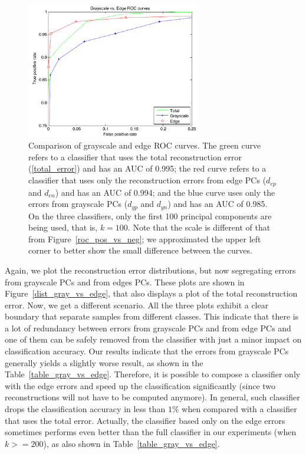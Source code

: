 \documentclass[10pt, conference, compsocconf]{IEEEtran}
\begin{document}
\begin{figure}[t!]
\centering
\includegraphics[width=3in]{roc_gray_vs_edge}
\caption{Comparison of grayscale and edge ROC curves. The green curve refers to a classifier that uses the total reconstruction error (\ref{total_error}) and has an AUC of 0.995; the red curve refers to a classifier that uses only the reconstruction errors from edge PCs ($d_{ep}$ and $d_{en}$) and has an AUC of 0.994; and the blue curve uses only the errors from grayscale PCs ($d_{gp}$ and $d_{gn}$) and has an AUC of 0.985. On the three classifiers, only the first 100 principal components are being used, that is, $k=100$. Note that the scale is different of that from Figure~\ref{roc_pos_vs_neg}; we approximated the upper left corner to better show the small difference between the curves.}
\label{roc_gray_vs_edge}
\end{figure}

Again, we plot the reconstruction error distributions, but now segregating errors from grayscale PCs and from edges PCs. These plots are shown in Figure~\ref{dist_gray_vs_edge}, that also displays a plot of the total reconstruction error. Now, we get a different scenario. All the three plots exhibit a clear boundary that separate samples from different classes. This indicate that there is a lot of redundancy between errors from grayscale PCs and from edge PCs and one of them can be safely removed from the classifier with just a minor impact on classification accuracy. Our results indicate that the errors from grayscale PCs generally yields a slightly worse result, as shown in the Table~\ref{table_gray_vs_edge}. Therefore, it is possible to compose a classifier only with the edge errors and speed up the classification significantly (since two reconstructions will not have to be computed anymore). In general, such classifier drops the classification accuracy in less than $1\%$ when compared with a classifier that uses the total error. Actually, the classifier based only on the edge errors sometimes performs even better than the full classifier in our experiments (when $k >= 200$), as also shown in Table~\ref{table_gray_vs_edge}.
\end{document}
